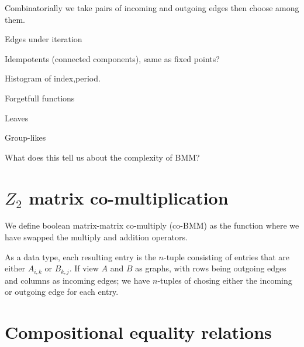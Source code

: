 \documentclass{article}
\begin{document}
Combinatorially we take pairs of incoming and outgoing edges then choose among them.


Edges under iteration

Idempotents (connected components), same as fixed points?

Histogram of index,period.

Forgetfull functions

Leaves

Group-likes


What does this tell us about the complexity of BMM?



\section{$Z_{2}$ matrix co-multiplication }
We define boolean matrix-matrix co-multiply (co-BMM) as the function where we have swapped the multiply and addition operators. 

As a data type, each resulting entry is the $n$-tuple consisting of entries that are either $A_{i,k}$ or $B_{k,j}$. If view $A$ and $B$ as graphs, with rows being outgoing edges and columns as incoming edges; we have $n$-tuples of chosing either the incoming or outgoing edge for each entry.

\section{Compositional equality relations}





\nocite{*}


\end{document}

